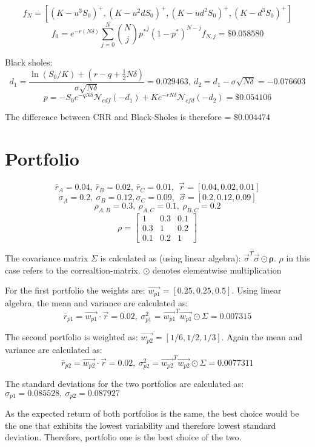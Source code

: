 \documentclass{article}
\begin{document}
$$f_N = \left[ (K-u^3S_0)^+, (K-u^2dS_0)^+, (K-ud^2S_0)^+, (K-d^3S_0)^+ \right]$$
$$f_0 = e^{-r(N\delta)}\sum_{j=0}^N \binom{N}{j}{p^*}^j(1-p^*)^{N-j}f_{N,j} = \$0.058580$$

Black sholes:
$$d_1 = \frac{\ln(S_0/K) + (r-q+\frac{1}{2}N\delta)}{\sigma\sqrt{N\delta}} = 0.029463, \ d_2 = d_1-\sigma\sqrt{N\delta} = -0.076603$$
$$p = -S_0e^{-qN\delta}\mathcal{N}_{cdf}(-d_1) + Ke^{-rN\delta}\mathcal{N}_{cfd}(-d_2) = \$0.054106$$

The difference between CRR and Black-Sholes is therefore = $\$0.004474$

\section{Portfolio}

$$\bar{r}_A = 0.04, \ \bar{r}_B = 0.02, \ \bar{r}_C = 0.01, \ \ \vec{r} = \left[0.04, 0.02, 0.01\right]$$
$$\sigma_A = 0.2, \ \sigma_B = 0.12, \sigma_C = 0.09, \ \ \vec{\sigma} = \left[0.2, 0.12, 0.09\right]$$
$$\rho_{A, B} = 0.3, \ \rho_{A, C} = 0.1, \ \rho_{B, C} = 0.2$$
$$\rho = \begin{bmatrix} 1 & 0.3 & 0.1 \\ 0.3 & 1 & 0.2 \\ 0.1 & 0.2 & 1 \end{bmatrix}$$

The covariance matrix $\Sigma$ is calculated as (using linear algebra): $\vec{\sigma}^T \vec{\sigma} \odot \mathbf{\rho}$. $\rho$ in this case refers to the correaltion-matrix. $\odot$ denotes elementwise multiplication

For the first portfolio the weights are: $\vec{w_{p1}} = \left[0.25, 0.25, 0.5\right]$.
Using linear algebra, the mean and variance are calculated as:
$$\bar{r}_{p1} = \vec{w_{p1}} \cdot \vec{r} = 0.02, \ \sigma^2_{p1} = \vec{w_{p1}}^T\vec{w_{p1}} \odot \Sigma = 0.007315$$

The second portfolio is weighted as: $\vec{w_{p2}} = \left[1/6, 1/2, 1/3 \right]$.
Again the mean and variance are calculated as:
$$\bar{r}_{p2} = \vec{w_{p2}} \cdot \vec{r} = 0.02, \ \sigma^2_{p2} = \vec{w_{p2}}^T\vec{w_{p2}} \odot \Sigma = 0.0077311$$

The standard deviations for the two portfolios are calculated as: $\sigma_{p1} = 0.085528, \ \sigma_{p2} = 0.087927$

As the expected return of both portfolios is the same, the best choice would be the one that exhibits the lowest variability and therefore lowest standard deviation. Therefore, portfolio one is the best choice of the two. 
\end{document}
